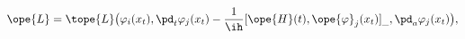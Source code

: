 \begin{equation}	\label{12.78new}
\ope{L}
=
\tope{L}\bigl( \varphi_i(x_t),
	\pd_t\varphi_j(x_t)
	- \frac{1}{\ih}
	[ \ope{H}(t),\ope{\varphi}_j(x_t) ]_{\_}
	,
	\pd_a\varphi_j(x_t) \bigr) ,
	\end{equation}

